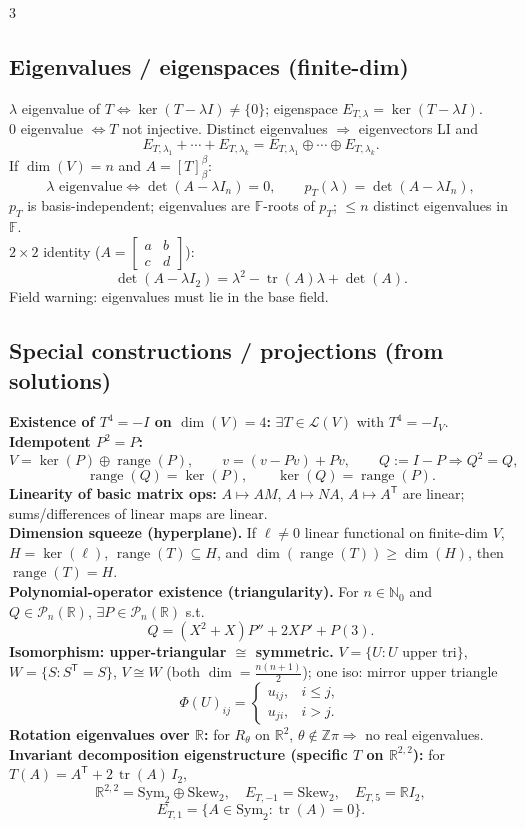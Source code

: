 \documentclass[10pt]{article}
\newcommand{\R}{\mathbb{R}}
\newcommand{\F}{\mathbb{F}}
\newcommand{\N}{\mathbb{N}}
\newcommand{\Z}{\mathbb{Z}}
\newcommand{\Ker}{\operatorname{ker}}
\newcommand{\Range}{\operatorname{range}}
\newcommand{\tr}{\operatorname{tr}}
\begin{document}
\begin{multicols}{3}
\subsection*{Eigenvalues / eigenspaces (finite-dim)}
$\lambda$ eigenvalue of $T\iff \Ker(T-\lambda I)\neq\{0\}$; eigenspace $E_{T,\lambda}=\Ker(T-\lambda I)$.\\
$0$ eigenvalue $\iff T$ not injective. Distinct eigenvalues $\Rightarrow$ eigenvectors LI and
\[
E_{T,\lambda_1}+\cdots+E_{T,\lambda_k}=E_{T,\lambda_1}\oplus\cdots\oplus E_{T,\lambda_k}.
\]
If $\dim(V)=n$ and $A=[T]^{\beta}_{\beta}$:
\[
\lambda\text{ eigenvalue}\iff \det(A-\lambda I_n)=0,\qquad p_T(\lambda)=\det(A-\lambda I_n),
\]
$p_T$ is basis-independent; eigenvalues are $\F$-roots of $p_T$; $\le n$ distinct eigenvalues in $\F$.\\
$2\times 2$ identity ($A=\begin{bmatrix}a&b\\c&d\end{bmatrix}$):
\[
\det(A-\lambda I_2)=\lambda^2-\tr(A)\lambda+\det(A).
\]
Field warning: eigenvalues must lie in the base field.

\subsection*{Special constructions / projections (from solutions)}
\textbf{Existence of $T^4=-I$ on $\dim(V)=4$:} $\exists T\in\mathcal{L}(V)$ with $T^4=-I_V$.\\
\textbf{Idempotent $P^2=P$:}
\[
V=\Ker(P)\oplus \Range(P),\qquad v=(v-Pv)+Pv,\qquad Q:=I-P\Rightarrow Q^2=Q,
\]
\[
\Range(Q)=\Ker(P),\qquad \Ker(Q)=\Range(P).
\]
\textbf{Linearity of basic matrix ops:} $A\mapsto AM$, $A\mapsto NA$, $A\mapsto A^{\mathsf T}$ are linear; sums/differences of linear maps are linear.\\
\textbf{Dimension squeeze (hyperplane).} If $\ell\neq 0$ linear functional on finite-dim $V$, $H=\Ker(\ell)$, $\Range(T)\subseteq H$, and $\dim(\Range(T))\ge \dim(H)$, then $\Range(T)=H$.\\[1pt]
\textbf{Polynomial-operator existence (triangularity).} For $n\in\N_0$ and $Q\in\mathcal{P}_n(\R)$, $\exists P\in\mathcal{P}_n(\R)$ s.t.
\[
Q=(X^2+X)P''+2XP'+P(3).
\]
\textbf{Isomorphism: upper-triangular $\cong$ symmetric.} $V=\{U:U\text{ upper tri}\}$, $W=\{S:S^{\mathsf T}=S\}$, $V\cong W$ (both $\dim=\frac{n(n+1)}{2}$); one iso: mirror upper triangle
\[
\Phi(U)_{ij}=\begin{cases}u_{ij},&i\le j,\\ u_{ji},&i>j.\end{cases}
\]
\textbf{Rotation eigenvalues over $\R$:} for $R_{\theta}$ on $\R^2$, $\theta\notin \Z\pi\Rightarrow$ no real eigenvalues.\\
\textbf{Invariant decomposition eigenstructure (specific $T$ on $\R^{2,2}$):} for $T(A)=A^{\mathsf T}+2\,\tr(A)\,I_2$,
\[
\R^{2,2}=\mathrm{Sym}_2\oplus\mathrm{Skew}_2,\quad
E_{T,-1}=\mathrm{Skew}_2,\quad
E_{T,5}=\R I_2,
\]
\[
E_{T,1}=\{A\in\mathrm{Sym}_2:\tr(A)=0\}.
\]


\end{multicols}
\end{document}
